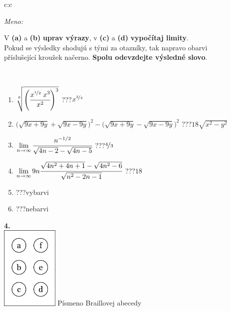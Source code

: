 \documentclass[10pt]{report}
\begin{document}
\begin{tabular}{c:c}
\begin{minipage}[c][104.5mm][t]{0.5\linewidth}
\begin{center}
\textit{Meno:}\phantom{xxxxxxxxxxxxxxxxxxxxxxxxxxxxxxxxxxxxxxxxxxxxxxxxxxxxxxxxxxxxxxxxx}\\[5mm]
\begin{minipage}{0.95\linewidth}
\begin{center}
V \textbf{(a)} a \textbf{(b)} \textbf{uprav výrazy}, v \textbf{(c)} a \textbf{(d)} \textbf{vypočítaj limity}.\\Pokud se výsledky shodujú s tými za otazníky, tak napravo obarvi\\příslušející kroužek načerno. \textbf{Spolu odevzdejte výsledné slovo}.
\end{center}
\end{minipage}
\\[1mm]
\begin{minipage}{0.79\linewidth}
\begin{center}
\begin{varwidth}{\linewidth}
\begin{enumerate}
\small
\item $\sqrt[6]{\left(\cfrac{x^{\nicefrac{1}{2}}\;x^{3}}{x^{2}}\right)^{3}}$\quad \dotfill\; ???\;\dotfill \quad $x^{\nicefrac{3}{4}}$
\item {\footnotesize{\scriptsize$\big(\sqrt{9x+9y}+\sqrt{9x-9y}\big)^2-\big(\sqrt{9x+9y}-\sqrt{9x-9y}\big)^2$}\quad \dotfill\; ???\;\dotfill \quad $18\sqrt{x^2-y^2}$}
\item $\lim\limits_{n\to\infty}\cfrac{n^{-1/2}}{\sqrt{4n-2}-\sqrt{4n-5}}$\quad \dotfill\; ???\;\dotfill \quad $\nicefrac{4}{3}$
\item $\lim\limits_{n\to\infty}9n\cfrac{\sqrt{4n^2+4n+1}-\sqrt{4n^2-6}}{\sqrt{n^2-2n-1}}$\quad \dotfill\; ???\;\dotfill \quad $18$
\item \quad \dotfill\; ???\;\dotfill \quad vybarvi
\item \quad \dotfill\; ???\;\dotfill \quad nebarvi
\end{enumerate}
\end{varwidth}
\end{center}
\end{minipage}
\begin{minipage}{0.20\linewidth}
\begin{center}
{\Huge\bfseries 4.} \\[2mm]
\includegraphics[height=40mm]{../images/braille.png}
{\small Písmeno Braillovej abecedy}
\end{center}
\end{minipage}
\end{center}
\end{minipage}
%
\end{tabular}
\end{document}
